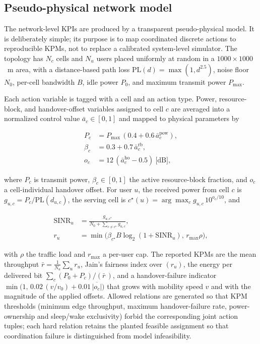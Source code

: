 \documentclass[pdflatex,sn-mathphys-num,iicol,oneside]{sn-jnl}
\begin{document}
\subsection{Pseudo-physical network model}
\label{sec:physical-model}

The network-level KPIs are produced by a transparent pseudo-physical
model. It is deliberately simple; its purpose is to map coordinated
discrete actions to reproducible KPMs, not to replace a calibrated
system-level simulator. The topology has $N_c$ cells and $N_u$ users
placed uniformly at random in a $1000\times1000$~m area, with a
distance-based path loss $\mathrm{PL}(d)=\max(1,d^{2.5})$, noise floor
$N_0$, per-cell bandwidth $B$, idle power $P_0$, and maximum transmit
power $P_{\max}$.

Each action variable is tagged with a cell and an action type. Power,
resource-block, and handover-offset variables assigned to cell $c$ are
averaged into a normalized control value $\bar a_c\in[0,1]$ and mapped
to physical parameters by

\begin{align}
P_c &= P_{\max}\,(0.4+0.6\,\bar a_c^{\mathrm{pow}}),\\
\beta_c &= 0.3+0.7\,\bar a_c^{\mathrm{rb}},\\
o_c &= 12\,(\bar a_c^{\mathrm{ho}}-0.5)\ \text{[dB]},
\end{align}

where $P_c$ is transmit power, $\beta_c\in[0,1]$ the active
resource-block fraction, and $o_c$ a cell-individual handover offset.
For user $u$, the received power from cell $c$ is
$g_{u,c}=P_c/\mathrm{PL}(d_{u,c})$, the serving cell is
$c^\star(u)=\arg\max_c g_{u,c}\,10^{o_c/10}$, and

\begin{align}
\mathrm{SINR}_u &=
\frac{g_{u,c^\star}}{N_0+\sum_{c\neq c^\star} g_{u,c}},\\
r_u &= \min\!\big(\beta_{c^\star} B\log_2(1+\mathrm{SINR}_u),\,
r_{\max}\rho\big),
\end{align}

with $\rho$ the traffic load and $r_{\max}$ a per-user cap. The
reported KPMs are the mean throughput $\bar r=\frac1{N_u}\sum_u r_u$,
Jain's fairness index over $(r_u)$, the energy per delivered bit
$\sum_c (P_0+P_c)/(\bar r\,)$, and a handover-failure indicator
$\min\!\big(1,\,0.02\,(v/v_0)+0.01\,\overline{|o_c|}\big)$ that grows
with mobility speed $v$ and with the magnitude of the applied offsets.
Allowed relations are generated so that KPM thresholds (minimum
edge throughput, maximum handover-failure rate, power-ownership and
sleep/wake exclusivity) forbid the corresponding joint action tuples;
each hard relation retains the planted feasible assignment so that
coordination failure is distinguished from model infeasibility.
\end{document}

